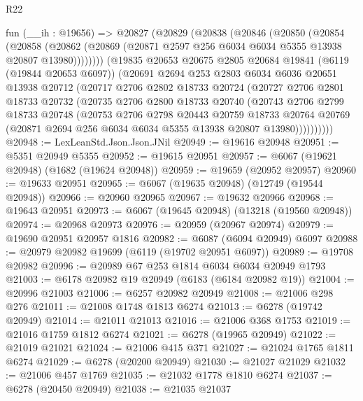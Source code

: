 \begin{lexlean}{R22}
\begin{coremodule}
    fun (__ih : @19656) =>
    @20827
      (@20829
        (@20838
          (@20846
            (@20850
              (@20854
                (@20858
                  (@20862 (@20869 (@20871 @2597 @256 @6034 @6034 @5355 @13938 @20807 @13980))))))))
        (@19835
          @20653
          @20675
          @2805
          @20684
          @19841
          (@6119 (@19844 @20653 @6097))
          (@20691
            @2694
            @253
            @2803
            @6034
            @6036
            @20651
            @13938
            @20712
            (@20717
              @2706
              @2802
              @18733
              @20724
              (@20727
                @2706
                @2801
                @18733
                @20732
                (@20735
                  @2706
                  @2800
                  @18733
                  @20740
                  (@20743
                    @2706
                    @2799
                    @18733
                    @20748
                    (@20753
                      @2706
                      @2798
                      @20443
                      @20759
                      @18733
                      @20764
                      @20769
                      (@20871 @2694 @256 @6034 @6034 @5355 @13938 @20807 @13980))))))))))
@20948 := LexLeanStd.Json.Json.JNil
@20949 := @19616 @20948
@20951 := @5351 @20949 @5355
@20952 := @19615 @20951
@20957 := @6067 (@19621 @20948) (@1682 (@19624 @20948))
@20959 := @19659 (@20952 @20957)
@20960 := @19633 @20951
@20965 := @6067 (@19635 @20948) (@12749 (@19544 @20948))
@20966 := @20960 @20965
@20967 := @19632 @20966
@20968 := @19643 @20951
@20973 := @6067 (@19645 @20948) (@13218 (@19560 @20948))
@20974 := @20968 @20973
@20976 := @20959 (@20967 @20974)
@20979 := @19690 @20951 @20957 @1816
@20982 := @6087 (@6094 @20949) @6097
@20988 := @20979 @20982 @19699 (@6119 (@19702 @20951 @6097))
@20989 := @19708 @20982
@20996 := @20989 @67 @253 @1814 @6034 @6034 @20949 @1793
@21003 := @6178 @20982 @19 @20949 (@6183 (@6184 @20982 @19))
@21004 := @20996 @21003
@21006 := @6257 @20982 @20949
@21008 := @21006 @298 @276
@21011 := @21008 @1748 @1813 @6274
@21013 := @6278 (@19742 @20949)
@21014 := @21011 @21013
@21016 := @21006 @368 @1753
@21019 := @21016 @1759 @1812 @6274
@21021 := @6278 (@19965 @20949)
@21022 := @21019 @21021
@21024 := @21006 @415 @371
@21027 := @21024 @1765 @1811 @6274
@21029 := @6278 (@20200 @20949)
@21030 := @21027 @21029
@21032 := @21006 @457 @1769
@21035 := @21032 @1778 @1810 @6274
@21037 := @6278 (@20450 @20949)
@21038 := @21035 @21037

\end{coremodule}
\end{lexlean}
